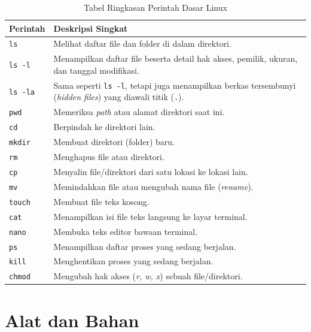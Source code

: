 \begin{table}[H]
	\caption{Tabel Ringkasan Perintah Dasar Linux}
	\label{tab:m03-dasar-teori}
	\small
	\begin{tabularx}{\textwidth}{|l|X|}
		\hline
		\textbf{Perintah} & \textbf{Deskripsi Singkat} \\ \hline
		\texttt{ls}       & Melihat daftar file dan folder di dalam direktori. \\ \hline
		\texttt{ls -l}    & Menampilkan daftar file beserta detail hak akses, pemilik, ukuran, dan tanggal modifikasi. \\ \hline
		\texttt{ls -la}   & Sama seperti \texttt{ls -l}, tetapi juga menampilkan berkas tersembunyi (\textit{hidden files}) yang diawali titik (\texttt{.}). \\ \hline
		\texttt{pwd}      & Memeriksa \textit{path} atau alamat direktori saat ini. \\ \hline
		\texttt{cd}       & Berpindah ke direktori lain. \\ \hline
		\texttt{mkdir}    & Membuat direktori (folder) baru. \\ \hline
		\texttt{rm}       & Menghapus file atau direktori. \\ \hline
		\texttt{cp}       & Menyalin file/direktori dari satu lokasi ke lokasi lain. \\ \hline
		\texttt{mv}       & Memindahkan file atau mengubah nama file (\textit{rename}). \\ \hline
		\texttt{touch}    & Membuat file teks kosong. \\ \hline
		\texttt{cat}      & Menampilkan isi file teks langsung ke layar terminal. \\ \hline
		\texttt{nano}     & Membuka teks editor bawaan terminal. \\ \hline
		\texttt{ps}       & Menampilkan daftar proses yang sedang berjalan. \\ \hline
		\texttt{kill}     & Menghentikan proses yang sedang berjalan. \\ \hline
		\texttt{chmod}    & Mengubah hak akses (\textit{r, w, x}) sebuah file/direktori. \\ \hline
	\end{tabularx}
\end{table}

\newpage
\section{Alat dan Bahan}
\label{sec:m03-alat-bahan}

